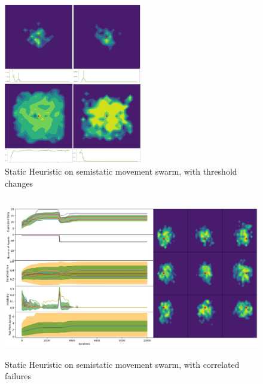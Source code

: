 \documentclass{UoYCSproject}
\begin{document}
\begin{figure}[htb]
\label{fig:Threshold_Changes}
\begin{center}
\centering
\includegraphics[height=7cm]{"./Static_Heuristic/Threshold_Changes.png"}
\caption{Static Heuristic on semi\-static movement swarm, with threshold changes}
\end{center}
\end{figure}

\begin{figure}[htb]
\label{fig:static_movement_con}
\begin{center}
\centering
\includegraphics[height=7cm]{"./Static_Heuristic/Static_Movement_concurrent.png"}
\caption{Static Heuristic on semi\-static movement swarm, with correlated failures}
\end{center}
\end{figure}
\end{document}

